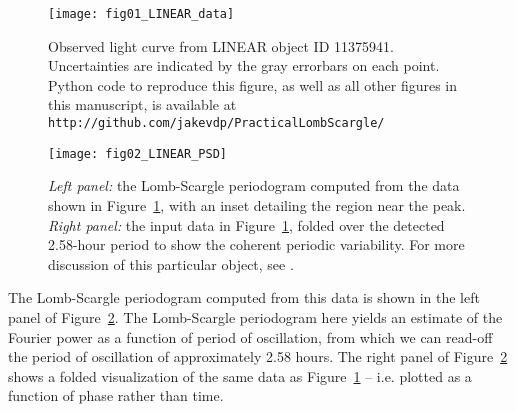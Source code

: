 \documentclass[preprint]{aastex}
\newcommand{\fig}[1]{Figure~\ref{fig:#1}}
\newcommand{\figlabel}[1]{\label{fig:#1}}
\begin{document}
\begin{figure}[ht]
\centering
\texttt{[image: fig01\_LINEAR\_data]}
\caption{Observed light curve from LINEAR object ID 11375941. Uncertainties
  are indicated by the gray errorbars on each point.
  Python code to reproduce this figure, as well as all other figures
  in this manuscript, is available at {\tt http://github.com/jakevdp/PracticalLombScargle/}
  \figlabel{LINEAR-data}
}
\end{figure}


\begin{figure}[ht]
\centering
\texttt{[image: fig02\_LINEAR\_PSD]}
\caption{{\it Left panel:} the Lomb-Scargle periodogram computed from the data
    shown in \fig{LINEAR-data}, with an inset detailing the region near the peak.
    {\it Right panel:} the input data in \fig{LINEAR-data}, folded over the
    detected 2.58-hour period to show the coherent periodic variability.
    For more discussion of this particular object, see \citep{LINEAR3}.
    \figlabel{LINEAR-power}
}
\end{figure}

The Lomb-Scargle periodogram computed from this data is shown in the left
panel  of \fig{LINEAR-power}.
The Lomb-Scargle periodogram here yields an estimate of the Fourier
power as a function of period of oscillation, from
which we can read-off the period of oscillation of approximately 2.58 hours.
The right panel of \fig{LINEAR-power} shows a folded visualization of
the same data as \fig{LINEAR-data} -- i.e.{} plotted as a function of phase
rather than time.
\end{document}
